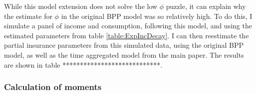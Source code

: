 

While this model extension does not solve the low $\phi$ puzzle, it can explain why the estimate for $\phi$ in the original BPP model was so relatively high. To do this, I simulate a panel of income and consumption, following this model, and using the estimated parameters from table \ref{table:ExpIncDecay}. I can then reestimate the partial insurance parameters from this simulated data, using the original BPP model, as well as the time aggregated model from the main paper. The results are shown in table ****************************.

\subsubsection{Calculation of moments} \label{exp_decay_moments_appendix}

